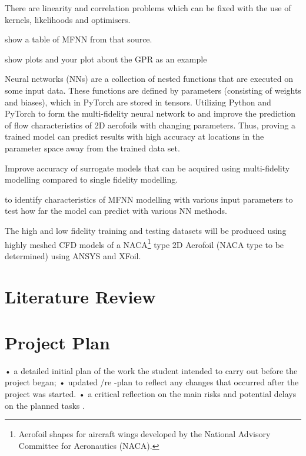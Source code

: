 \documentclass[12pt,letterpaper]{article}
\begin{document}
        There are linearity and correlation problems which can be fixed with the use of kernels, likelihoods and optimisers.
        
        
        show a table of MFNN from that source.
        
        show plots and your plot about the GPR as an example
    
        Neural networks (NNs) are a collection of nested functions that are executed on some input data. These functions are defined by parameters (consisting of weights and biases), which in PyTorch are stored in tensors. Utilizing Python and PyTorch to form the multi-fidelity neural network to and improve the prediction of flow characteristics of 2D aerofoils with changing parameters. Thus, proving a trained model can predict results with high accuracy at locations in the parameter space away from the trained data set. 
         
        Improve accuracy of surrogate models that can be acquired using multi-fidelity modelling compared to single fidelity modelling.
        
        
        
        to identify characteristics of MFNN modelling with various input parameters to test how far the model can predict with various NN methods.
        
        The high and low fidelity training and testing datasets will be produced using highly meshed CFD models of a NACA\footnote{Aerofoil shapes for aircraft wings developed by the National Advisory Committee for Aeronautics (NACA).} type 2D Aerofoil (NACA type to be determined) using ANSYS and XFoil.
   
\section{Literature Review} \label{litreview}
\vspace{-1.5em}




\section{Project Plan} \label{projectplan}
\vspace{-1.5em}





• a detailed initial plan of the work the student
intended to carry out before the project began;
• updated /re
-plan to reflect any changes that occurred
after the project was started.
• a critical reflection on the main risks and potential
delays on the planned tasks
.












\newpage
\setlength{}
\printbibliography
\end{document}
